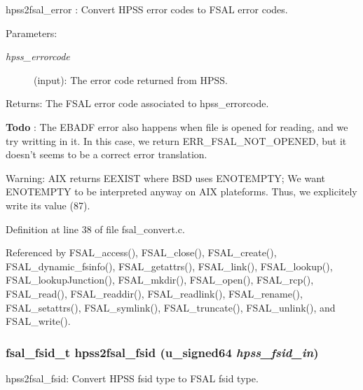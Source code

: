 hpss2fsal\_\-error : Convert HPSS error codes to FSAL error codes.

\begin{Desc}
\item[Parameters:]
\begin{description}
\item[{\em hpss\_\-errorcode}](input): The error code returned from HPSS.\end{description}
\end{Desc}
\begin{Desc}
\item[Returns:]The FSAL error code associated to hpss\_\-errorcode.\end{Desc}


\begin{Desc}
\item[{\bf Todo}]: The EBADF error also happens when file is opened for reading, and we try writting in it. In this case, we return ERR\_\-FSAL\_\-NOT\_\-OPENED, but it doesn't seems to be a correct error translation. \end{Desc}


\begin{Desc}
\item[Warning:]AIX returns EEXIST where BSD uses ENOTEMPTY; We want ENOTEMPTY to be interpreted anyway on AIX plateforms. Thus, we explicitely write its value (87). \end{Desc}


Definition at line 38 of file fsal\_\-convert.c.

Referenced by FSAL\_\-access(), FSAL\_\-close(), FSAL\_\-create(), FSAL\_\-dynamic\_\-fsinfo(), FSAL\_\-getattrs(), FSAL\_\-link(), FSAL\_\-lookup(), FSAL\_\-lookup\-Junction(), FSAL\_\-mkdir(), FSAL\_\-open(), FSAL\_\-rcp(), FSAL\_\-read(), FSAL\_\-readdir(), FSAL\_\-readlink(), FSAL\_\-rename(), FSAL\_\-setattrs(), FSAL\_\-symlink(), FSAL\_\-truncate(), FSAL\_\-unlink(), and FSAL\_\-write().
\subsubsection{\setlength{\rightskip}{0pt plus 5cm}fsal\_\-fsid\_\-t hpss2fsal\_\-fsid (u\_\-signed64 {\em hpss\_\-fsid\_\-in})}\label{fsal__convert_8c_a11}


hpss2fsal\_\-fsid: Convert HPSS fsid type to FSAL fsid type.

